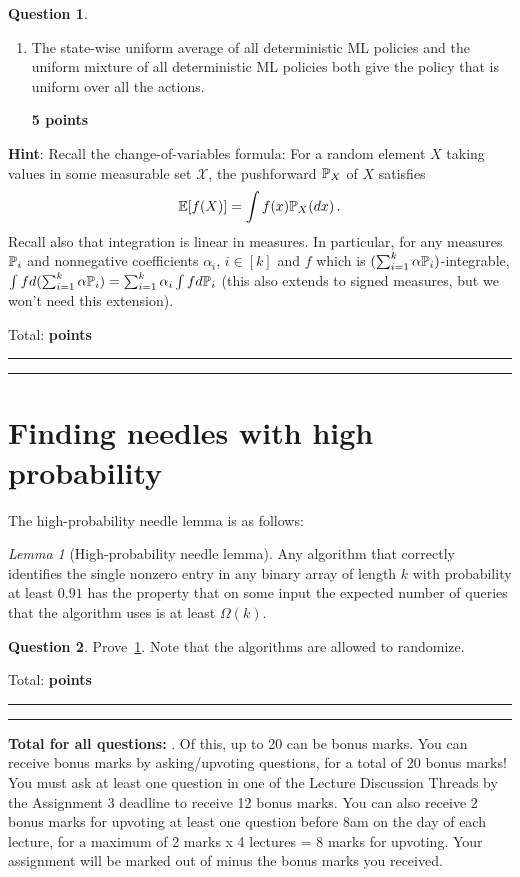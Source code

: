 \documentclass{article}
\newcommand{\cX}{\mathcal{X}}
\DeclareMathOperator*{\1}{\mathbbm{1}}
\newcommand{\E}{\mathbb E}
\newcommand{\EE}[1]{\E[#1]}
\newcommand{\0}{\mathbf{0}}
\newcounter{DocPoints}
\newcounter{QuestionPoints}
\newcommand{\points}[1]{	\par\mbox{}\par\noindent\hfill {\bf #1 points}	\addtocounter{DocPoints}{#1}
	\addtocounter{QuestionPoints}{#1}
}
\newcommand{\tpoints}[1]{        	\ifthenelse{\isempty{#1}}	{	}	{		\addtocounter{DocPoints}{#1}
		\addtocounter{QuestionPoints}{#1}
	}													 	\par\mbox{}\par\noindent\hfill {Total: \bf \arabic{QuestionPoints}\xspace points}\par\mbox{}\par\hrule\hrule
	\setcounter{QuestionPoints}{0}
}
\theoremstyle{definition}
\newtheorem{question}{Question}
\theoremstyle{remark}
\theoremstyle{theorem}
\newtheorem{lemma}{Lemma}
\newcommand{\hint}{\noindent \textbf{Hint}:\xspace}
\begin{document}
\begin{question}
\begin{enumerate}
\points{10}
\item The state-wise uniform average of all deterministic ML policies and the uniform mixture of all deterministic ML policies both give the policy that is uniform over all the actions.
\points{5}
\end{enumerate}
\hint
Recall the change-of-variables formula:
For a random element $X$ taking values in some measurable set $\cX$,
the pushforward $\mathbb{P}_X$ of $X$ satisfies
\begin{align*}
\EE{ f(X) } = \int f(x) \PP_X(dx)\,.
\end{align*}
Recall also that integration is linear in measures.
In particular,
for any measures $\mathbb{P}_i$ and nonnegative coefficients $\alpha_i$, $i\in[k]$
and $f$ which is $(\sum_{i=1}^k \alpha \mathbb{P}_i)$-integrable,
 $\int f d(\sum_{i=1}^k \alpha \mathbb{P}_i) = \sum_{i=1}^k \alpha_i \int f d\mathbb{P}_i$
 (this also extends to signed measures, but we won't need this extension).
\tpoints{}
\end{question}



\section*{Finding needles with high probability}

The high-probability needle lemma is as follows:
\begin{lemma}[High-probability needle lemma]
\label{lem:hpn}
Any algorithm that
correctly identifies the single nonzero entry in any binary array of length $k$
with probability at least $0.91$
has the property that
on some input
the expected number of queries that the algorithm uses is
at least $\Omega(k)$.
\end{lemma}

\begin{question}
Prove~\cref{lem:hpn}.
Note that the algorithms are allowed to randomize.
\tpoints{30}
\end{question}





\bigskip
\bigskip

\noindent
\textbf{
Total for all questions: }.
Of this, up to 20 can be bonus marks. You can receive bonus marks by asking/upvoting questions, for a total of 20 bonus marks!
You must ask at least one question in one of the Lecture Discussion Threads by the Assignment 3 deadline to receive 12 bonus marks.
You can also receive 2 bonus marks for upvoting at least one question before 8am on the day of each lecture, for a maximum of 2 marks x 4 lectures = 8 marks for upvoting.
Your assignment will be marked out of  minus the bonus marks you received.
\end{document}
